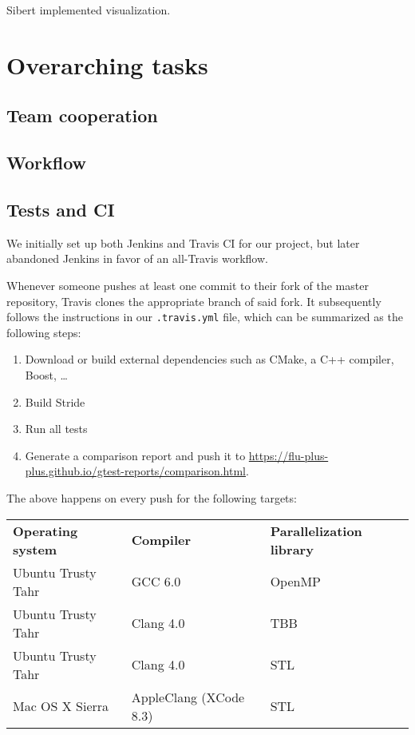 \documentclass[a4paper,12pt]{article}
\begin{document}
Sibert implemented visualization.

\section{Overarching tasks}
\subsection{Team cooperation} %
\subsection{Workflow} %
\subsection{Tests and CI} %

We initially set up both Jenkins and Travis CI for our project, but later abandoned Jenkins in favor of an all-Travis workflow.

Whenever someone pushes at least one commit to their fork of the master repository, Travis clones the appropriate branch of said fork. It subsequently follows the instructions in our \texttt{.travis.yml} file, which can be summarized as the following steps:

\begin{enumerate}
	\item Download or build external dependencies such as CMake, a C++ compiler, Boost, \dots
	\item Build Stride
	\item Run all tests
	\item Generate a comparison report and push it to \url{https://flu-plus-plus.github.io/gtest-reports/comparison.html}.
\end{enumerate}

The above happens on every push for the following targets:

\begin{tabular}{l|l|l}
	\textbf{Operating system} & \textbf{Compiler} & \textbf{Parallelization library} \\
	Ubuntu Trusty Tahr & GCC 6.0 & OpenMP \\
	Ubuntu Trusty Tahr & Clang 4.0 & TBB \\
	Ubuntu Trusty Tahr & Clang 4.0 & STL \\
	Mac OS X Sierra & AppleClang (XCode 8.3) & STL \\
\end{tabular}
\end{document}
